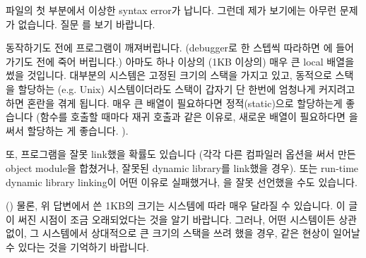 \begin{faq}
	파일의 첫 부분에서 이상한 syntax error가 납니다. 그런데 제가 보기에는 아무런
        문제가 없습니다.
\A
	질문 를 보기 바랍니다.
\end{faq}

\begin{faq}
	동작하기도 전에 프로그램이 깨져버립니다.  (debugger로 한 스텝씩
	따라하면 에 들어가기도 전에 죽어 버립니다.)
\A
	아마도 하나 이상의 (1KB 이상의)  매우 큰 local 배열을 썼을
	것입니다.  대부분의 시스템은 고정된 크기의 스택을 가지고 있고,
	동적으로 스택을 할당하는 (e.g.  Unix) 시스템이더라도 스택이
	갑자기 단 한번에 엄청나게 커지려고 하면 혼란을 겪게 됩니다.  매우 큰 배열이
	필요하다면 정적(static)으로 할당하는게 좋습니다 (함수를 호출할 때마다
	재귀 호출과 같은 이유로,
        새로운 배열이 필요하다면 을 써서 할당하는 게 좋습니다.
	).

        또, 프로그램을 잘못 link했을 확률도 있습니다 (각각
        다른 컴파일러 옵션을 써서 만든 object module을 합쳤거나, 잘못된 dynamic
        library를 link했을 경우). 또는 run-time dynamic library linking이
        어떤 이유로 실패했거나, 을 잘못 선언했을 수도 있습니다.

	()
\T
	물론, 위 답변에서 쓴 1KB의 크기는 시스템에 따라 매우 달라질 수 있습니다.
        이 글이 써진 시점이 조금 오래되었다는 것을 알기 바랍니다. 그러나,
        어떤 시스템이든 상관없이, 그 시스템에서 상대적으로 큰 크기의 스택을 쓰려 했을
        경우, 같은 현상이 일어날 수 있다는 것을 기억하기 바랍니다.
\end{faq}

